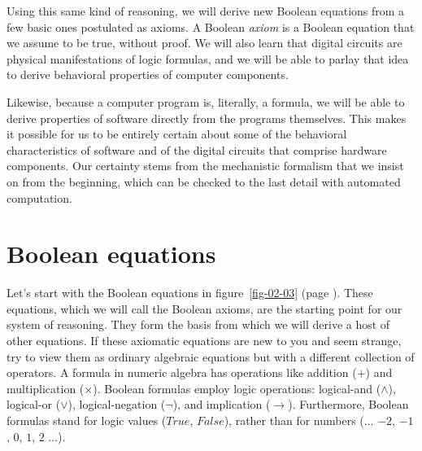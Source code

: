 Using this same kind of reasoning, we will derive new Boolean equations
from a few basic ones postulated as axioms.
A Boolean \emph{axiom} is a Boolean equation
that we assume to be true, without proof.
We will also learn that digital circuits are physical
manifestations of logic formulas, and we will be able to
parlay that idea to derive behavioral properties of
computer components.

Likewise, because a computer program is,
literally, a formula, we will be able to derive
properties of software directly from the programs themselves.
This makes it possible for us to be entirely
certain about some of the behavioral characteristics of
software and of the digital circuits that
comprise hardware components.
Our certainty stems from the mechanistic
formalism that we insist on from the beginning,
which can be checked to the last detail with automated computation.

\begin{exercises}


\end{exercises}

\section{Boolean equations}
\label{sec:boolean-equations}
Let's start with the Boolean equations in
figure~\ref{fig-02-03} (page \pageref{fig-02-03}).
These equations, which we will call the
Boolean axioms,
are the starting point for our system of reasoning.
They form the basis from which we will derive
a host of other equations.
If these axiomatic equations
are new to you and seem strange,
try to view them as ordinary
algebraic equations but with a different collection of operators.
A formula in numeric algebra has operations like addition
($+$) and multiplication ($\times$). Boolean formulas employ logic
operations: logical-and ($\wedge$), logical-or ($\vee$),
logical-negation ($\neg$), and implication ($\rightarrow$).
Furthermore, Boolean formulas stand for logic values
($True$, $False$), rather than for numbers ($\dots$ $-2$, $-1$, $0$, $1$, $2$ $\dots$).

